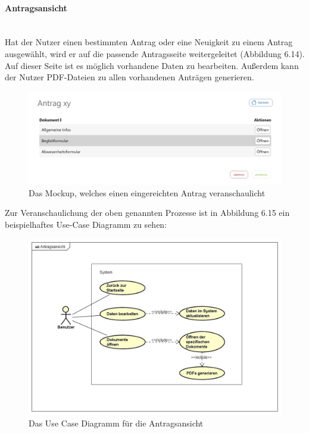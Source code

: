 \paragraph{Antragsansicht}
~\\
Hat der Nutzer einen bestimmten Antrag oder eine Neuigkeit zu einem Antrag ausgewählt, wird er auf die passende Antragsseite weitergeleitet (Abbildung 6.14). Auf dieser Seite ist es möglich vorhandene Daten zu bearbeiten. Außerdem kann der Nutzer PDF-Dateien zu allen vorhandenen Anträgen generieren.
\begin{figure}[H]
	\centering
	\includegraphics[width=1\linewidth]{images/Mockup-Antragsansicht}
	\caption[Mockup Antragsansicht]{Das Mockup, welches einen eingereichten Antrag veranschaulicht}
	\label{fig:mockupAntrag}
\end{figure}
Zur Veranschaulichung der oben genannten Prozesse ist in Abbildung 6.15 ein beispielhaftes Use-Case Diagramm zu sehen: 
\begin{figure}[H]
	\centering
	\includegraphics[width=1\linewidth]{images/uc-antrag}
	\caption[Use Case Diagramm Antragsansicht]{Das Use Case Diagramm für die Antragsansicht}
	\label{fig:ucAntrag}
\end{figure}